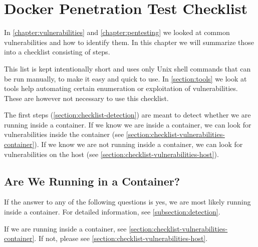 \chapter{Docker Penetration Test Checklist}\label{chapter:checklist}
In \autoref{chapter:vulnerabilities} and \autoref{chapter:pentesting} we looked at common vulnerabilities and how to identify them. In this chapter we will summarize those into a checklist consisting of steps.

This list is kept intentionally short and uses only Unix shell commands that can be run manually, to make it easy and quick to use. In \autoref{section:tools} we look at tools help automating certain enumeration or exploitation of vulnerabilities. These are however not necessary to use this checklist.

\medskip

The first steps (\autoref{section:checklist-detection}) are meant to detect whether we are running inside a container. If we know we are inside a container, we can look for vulnerabilities inside the container (see \autoref{section:checklist-vulnerabilities-container}). If we know we are not running inside a container, we can look for vulnerabilities on the host (see \autoref{section:checklist-vulnerabilities-host}).

\section{Are We Running in a Container?}\label{section:checklist-detection}
If the answer to any of the following questions is yes, we are most likely running inside a container. For detailed information, see \autoref{subsection:detection}.

\medskip

If we are running inside a container, see \autoref{section:checklist-vulnerabilities-container}. If not, please see \autoref{section:checklist-vulnerabilities-host}.

